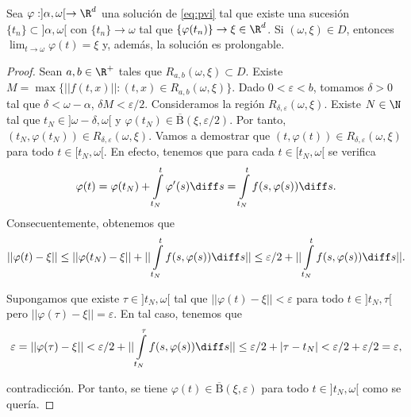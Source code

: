 \documentclass{article}
\begin{document}
\begin{lemma}\label{lem:prolongacion}
  Sea $\varphi : ]\alpha, \omega[ \to \R^d$ una solución de \eqref{eq:pvi} tal que existe una
  sucesión $\{t_n\} \subset ]\alpha, \omega[$ con $\{t_n\} \to \omega$ tal que
  $\{\varphi(t_n)\} \to \xi \in \R^d$. Si $(\omega, \xi) \in D$, entonces
  $\lim_{t \to \omega} \varphi(t) = \xi$ y, además, la solución es prolongable.
\end{lemma}
\begin{proof}
  Sean $a, b \in \R^+$ tales que $R_{a,b}(\omega, \xi) \subset D$. Existe
  $M = \max \{||f(t,x)||: (t,x) \in R_{a,b}(\omega, \xi)\}$. Dado $0 < \varepsilon < b$, tomamos
  $\delta > 0$ tal que $\delta < \omega - \alpha$, $\delta M < \varepsilon / 2$. Consideramos la
  región $R_{\delta, \varepsilon}(\omega, \xi)$. Existe $N \in \N$ tal que
  $t_N \in ]\omega-\delta, \omega[$ y $\varphi(t_N) \in \overline{\mathrm{B}}(\xi,
  \varepsilon/2)$. Por tanto, $(t_N, \varphi(t_N)) \in R_{\delta, \varepsilon}(\omega, \xi)$. Vamos
  a demostrar que $(t, \varphi(t)) \in R_{\delta, \varepsilon}(\omega, \xi)$ para todo
  $t \in [t_N, \omega[$. En efecto, tenemos que para cada $t \in [t_N, \omega[$ se verifica
  \[\varphi(t) = \varphi(t_N) + \int\limits_{t_N}^{t} \varphi'(s) \diff s = \int\limits_{t_N}^{t}
    f(s,\varphi(s)) \diff s.\] Consecuentemente, obtenemos que
  \[||\varphi(t)-\xi|| \le ||\varphi(t_N) - \xi|| + ||\int\limits_{t_N}^{t} f(s,\varphi(s)) \diff
    s|| \le \varepsilon / 2 + ||\int\limits_{t_N}^{t} f(s,\varphi(s)) \diff s||.\]

  Supongamos que existe $\tau \in ]t_N, \omega[$ tal que $||\varphi(t) - \xi|| < \varepsilon$ para
  todo $t \in ]t_N, \tau[$ pero $||\varphi(\tau) - \xi|| = \varepsilon$. En tal caso, tenemos que
  \[\varepsilon = ||\varphi(\tau) - \xi|| < \varepsilon / 2 + ||\int\limits_{t_N}^{\tau}
    f(s,\varphi(s)) \diff s|| \le \varepsilon / 2 + |\tau - t_N| < \varepsilon/2 + \varepsilon/2 =
    \varepsilon,\]

  contradicción. Por tanto, se tiene $\varphi(t) \in \overline{\mathrm{B}}(\xi, \varepsilon)$ para
  todo $t \in ]t_N, \omega[$ como se quería.
\end{proof}
\end{document}
